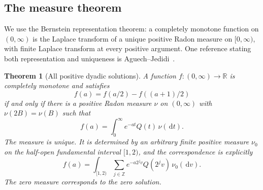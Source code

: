 \documentclass[11pt,letterpaper]{article}
\numberwithin{equation}{section}
\newtheorem{theorem}{Theorem}[section]
\theoremstyle{definition}
\theoremstyle{remark}
\newcommand{\R}{\mathbb R}
\newcommand{\Z}{\mathbb Z}
\newcommand{\dd}{\,\mathrm d}
\begin{document}
\subsection{The measure theorem}
We use the Bernstein representation theorem: a completely monotone
function on $(0,\infty)$ is the Laplace transform of a unique positive
Radon measure on $[0,\infty)$, with finite Laplace transform at every
positive argument. One reference stating both representation and uniqueness
is Aguech--Jedidi~\cite[Theorem~1]{AJ}.

\begin{theorem}[All positive dyadic solutions]\label{thm:classification}
A function $f:(0,\infty)\to\R$ is completely monotone and satisfies
\begin{equation}\label{eq:dyadicequation}
 f(a)=f(a/2)-f((a+1)/2)
\end{equation}
if and only if there is a positive Radon measure $\nu$ on $(0,\infty)$
with $\nu(2B)=\nu(B)$ such that
\begin{equation}\label{eq:frepresent}
 f(a)=\int_0^\infty e^{-at}Q(t)\,\nu(\dd t).
\end{equation}
The measure is unique. It is determined by an arbitrary finite positive
measure $\nu_0$ on the half-open fundamental interval $[1,2)$, and the
correspondence is explicitly
\begin{equation}\label{eq:shellrepresentation}
 f(a)=\int_{[1,2)}\sum_{j\in\Z}
          e^{-a2^jv}Q(2^jv)\,\nu_0(\dd v).
\end{equation}
The zero measure corresponds to the zero solution.
\end{theorem}
\end{document}
